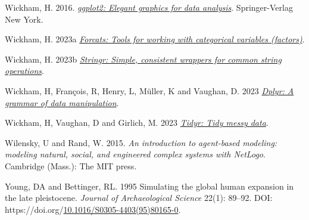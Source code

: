 \documentclass[
]{article}
\newlength{\cslhangindent}
\newlength{\cslentryspacingunit} %
\newenvironment{CSLReferences}[2] %
 {%
  \setlength{\parindent}{0pt}
  \ifodd #1
  \let\oldpar\par
  \def\par{\hangindent=\cslhangindent\oldpar}
  \fi
  \setlength{\parskip}{#2\cslentryspacingunit}
 }%
 {}
\begin{document}
\begin{CSLReferences}{1}{0}
\leavevmode{}%
Wickham, H. 2016. \emph{\href{http://ggplot2.org}{ggplot2: Elegant graphics for data analysis}}. Springer-Verlag New York.

\leavevmode{}%
Wickham, H. 2023a \emph{\href{https://forcats.tidyverse.org/}{Forcats: Tools for working with categorical variables (factors)}}.

\leavevmode{}%
Wickham, H. 2023b \emph{\href{https://stringr.tidyverse.org}{Stringr: Simple, consistent wrappers for common string operations}}.

\leavevmode{}%
Wickham, H, François, R, Henry, L, Müller, K and Vaughan, D. 2023 \emph{\href{https://dplyr.tidyverse.org}{Dplyr: A grammar of data manipulation}}.

\leavevmode{}%
Wickham, H, Vaughan, D and Girlich, M. 2023 \emph{\href{https://tidyr.tidyverse.org}{Tidyr: Tidy messy data}}.

\leavevmode{}%
Wilensky, U and Rand, W. 2015. \emph{An introduction to agent-based modeling: modeling natural, social, and engineered complex systems with NetLogo}. Cambridge (Mass.): The MIT press.

\leavevmode{}%
Young, DA and Bettinger, RL. 1995 Simulating the global human expansion in the late pleistocene. \emph{Journal of Archaeological Science} 22(1): 89--92. DOI: https://doi.org/\href{https://doi.org/10.1016/S0305-4403(95)80165-0}{10.1016/S0305-4403(95)80165-0}.

\end{CSLReferences}
\end{document}
